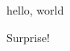 \documentclass{amsart}
\begin{document}
hello, world

\expandafter\def\csname\endcsname{Surprise!}

\csname\endcsname
\end{document}
